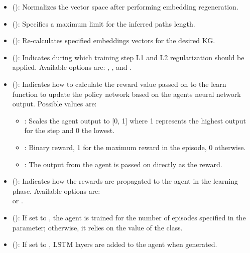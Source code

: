 \begin{itemize}
  \item {} (): Normalizes the vector space after performing embedding regeneration.
  \item {} (): Specifies  a maximum limit for the inferred paths length.
  \item {} (): Re-calculates specified embeddings vectors for the desired KG.
  \item {} (): Indicates during which training step L1 and L2 regularization should be applied. Available options are: , , and .
  \item {} (): Indicates how to calculate the reward value passed on to the learn function to update the policy network based on the agents neural network output. Possible values are:
  \begin{itemize}
    \item {}: Scales the agent output to [0, 1] where 1 represents the highest output for the step and 0 the lowest.
    \item {}: Binary reward, 1 for the maximum reward in the episode, 0 otherwise.
    \item {}: The output from the agent is passed on directly as the reward.
  \end{itemize}
  \item {} (): Indicates how the rewards are propagated to the agent in the learning phase. Available options are: 
 \\  or .
  \item {} (): If set to , the agent is trained for the number of episodes specified in the  parameter; otherwise, it relies on the  value of the  class.
   \item {} (): If set to , LSTM layers are added to the agent when generated.
\end{itemize}

